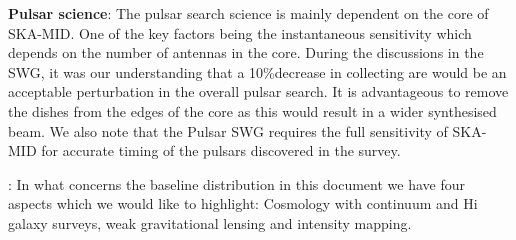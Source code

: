 \documentclass[sfheadings,a4paper,times,9pt,floats,floatfix]{article}
\begin{document}
{\bf Pulsar science}: The pulsar search science is mainly dependent on
the core of SKA-MID. One of the key factors being the instantaneous sensitivity which depends on the number of antennas
in the core. During the discussions in the SWG, it was our understanding that a 10\%decrease in collecting are would be
an acceptable perturbation in the overall pulsar search. It is advantageous to remove the dishes from the edges of the
core as this would result in a wider synthesised beam. We also note that the Pulsar SWG requires the full sensitivity of
SKA-MID for accurate timing of the pulsars discovered in the survey.

\smallskip
{}: In what concerns the baseline distribution in this document we have four
aspects which we would like to highlight: Cosmology with continuum and
H{\sc i} galaxy surveys, weak
gravitational lensing and intensity mapping.\\
\end{document}
